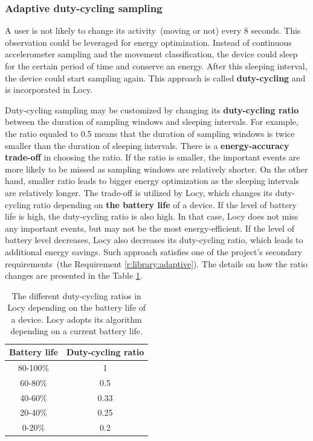 \subsubsection{Adaptive duty-cycling sampling}
\label{s:design:locy:adaptive}
\hspace{10pt}A user is not likely to change its activity\ (moving or not) every 8 seconds. This observation could be leveraged for energy optimization. Instead of continuous accelerometer sampling and the movement classification, the device could sleep for the certain period of time and conserve an energy. After this sleeping interval, the device could start sampling again. This approach is called \textbf{duty-cycling} and is incorporated in Locy. 

Duty-cycling sampling may be customized by changing its \textbf{duty-cycling ratio} between the duration of sampling windows and sleeping intervals. For example, the ratio equaled to 0.5 means that the duration of sampling windows is twice smaller than the duration of sleeping intervals. There is a \textbf{energy-accuracy trade-off} in choosing the ratio. If the ratio is smaller, the important events are more likely to be missed as sampling windows are relatively shorter. On the other hand, smaller ratio leads to bigger energy optimization as the sleeping intervals are relatively longer. The trade-off is utilized by Locy, which changes its duty-cycling ratio depending on \textbf{the battery life} of a device. If the level of battery life is high, the duty-cycling ratio is also high. In that case, Locy does not miss any important events, but may not be the most energy-efficient. If the level of battery level decreases, Locy also decreases its duty-cycling ratio, which leads to additional energy savings. Such approach satisfies one of the project's secondary requirements\ (the Requirement \ref{r:library:adaptive}). The details on how the ratio changes are presented in the Table \ref{table:locy:dutycyclingratio}.

\begin{table}[H]
	\centering
    \begin{tabular}{| c | c | }
    \hline
    Battery life & Duty-cycling ratio \\ \hline
    80-100\% & 1 \\ \hline
    60-80\% & 0.5\\ \hline
    40-60\% & 0.33\\ \hline
    20-40\% & 0.25\\ \hline
    0-20\% & 0.2 \\ \hline
    \end{tabular}
    \caption{The different duty-cycling ratios in Locy depending on the battery life of a device. Locy adopts its algorithm depending on a current battery life. }
	\label{table:locy:dutycyclingratio}
\end{table}	

